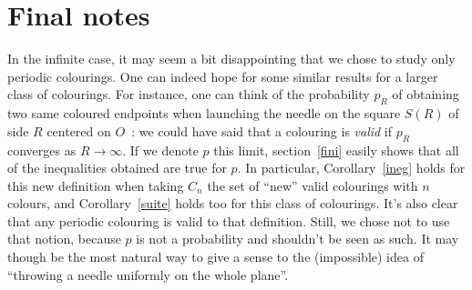\documentclass[a4paper,11pt]{article}
\theoremstyle{definition}
\theoremstyle{remark}
\begin{document}
\section{Final notes}
In the infinite case, it may seem a bit disappointing that we chose to study 
only periodic colourings. One can indeed hope for some similar results for a 
larger class of colourings. For instance, one can think of the probability $p_R$ 
of obtaining two same coloured endpoints when launching the needle on the square 
$S(R)$ of side $R$ centered on $O$~: we could have said that a colouring is 
\emph{valid} if $p_R$ converges 
as $R \rightarrow \infty$. If we denote $p$ this limit, section~\ref{fini} 
easily shows that all of the inequalities obtained are true for $p$. In 
particular, Corollary~\ref{ineg} holds for this new definition when taking $C_n$ 
the set of ``new'' valid colourings with $n$ colours, and Corollary~\ref{suite} 
holds too for this class of colourings. 
It's also clear that any periodic colouring is valid to that 
definition. Still, we chose not to use that notion, because $p$ is not a 
probability and shouldn't be 
seen as such. It may though be the most natural way to give a sense to 
the (impossible) idea of ``throwing a needle uniformly on the whole plane''.
\end{document}
